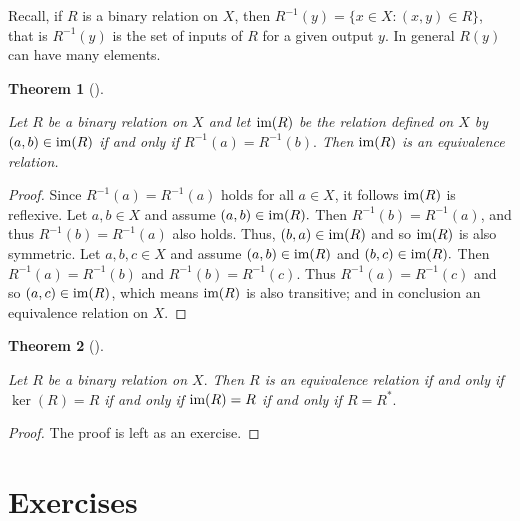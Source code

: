 \documentclass[
  letterpaper,
  10pt,
  reqno,
  twopage,
  openany]{book}
\theoremstyle{plain}
\theoremstyle{definition}
\theoremstyle{definition}
\theoremstyle{definition}
\theoremstyle{plain}
\theoremstyle{plain}
\newtheorem{theorem}{Theorem}[chapter]
\theoremstyle{remark}
\begin{document}
Recall, if \(R\) is a binary relation on \(X\), then
\(R^{-1}(y)=\{x\in X : (x,y)\in R\}\), that is \(R^{-1}(y)\) is the set
of inputs of \(R\) for a given output \(y.\) In general \(R(y)\) can
have many elements.

\leavevmode{}%
\begin{theorem}[]\label{thm-image-equivalence}

Let \(R\) be a binary relation on \(X\) and let \(\textnormal{im}(R)\)
be the relation defined on \(X\) by \((a,b)\in \textnormal{im}(R)\) if
and only if \(R^{-1}(a)=R^{-1}(b).\) Then \(\textnormal{im}(R)\) is an
equivalence relation.

\end{theorem}

\begin{proof}

Since \(R^{-1}(a)=R^{-1}(a)\) holds for all \(a\in X\), it follows
\(\textnormal{im}(R)\) is reflexive. Let \(a,b\in X\) and assume
\((a,b)\in\textnormal{im}(R).\) Then \(R^{-1}(b)=R^{-1}(a)\), and thus
\({R^{-1}(b)=R^{-1}(a)}\) also holds. Thus,
\((b,a)\in\textnormal{im}(R)\) and so \(\textnormal{im}(R)\) is also
symmetric. Let \(a,b,c\in X\) and assume \((a,b)\in\textnormal{im}(R)\)
and \((b,c)\in\textnormal{im}(R).\) Then \(R^{-1}(a)=R^{-1}(b)\) and
\(R^{-1}(b)=R^{-1}(c).\) Thus \(R^{-1}(a)=R^{-1}(c)\) and so
\((a,c)\in\textnormal{im}(R)\), which means \(\textnormal{im}(R)\) is
also transitive; and in conclusion an equivalence relation on \(X.\)

\end{proof}

\leavevmode{}%
\begin{theorem}[]\label{thm-equivalence-relation-in-terms}

Let \(R\) be a binary relation on \(X.\) Then \(R\) is an equivalence
relation if and only if \(\ker(R)=R\) if and only if
\(\textnormal{im}(R)=R\) if and only if \(R=R^*.\)

\end{theorem}

\begin{proof}

The proof is left as an exercise.

\end{proof}

\hypertarget{exercises-6}{%
\section{Exercises}\label{exercises-6}}
\end{document}
